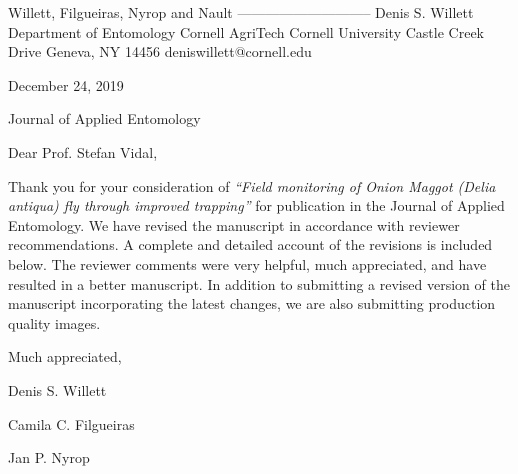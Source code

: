 \documentclass{article}
\begin{document}
\begin{addmargin}[2.8in]{}
Willett, Filgueiras, \newline
Nyrop and Nault \newline
----------------------------- \newline
Denis S. Willett\newline
Department of Entomology \newline
Cornell AgriTech  \newline
Cornell University  Castle Creek Drive \newline
Geneva, NY 14456 \newline
deniswillett@cornell.edu \newline
\end{addmargin}
\setlength{\parindent}{0cm}

December 24, 2019

\vspace{1.24em}

Journal of Applied Entomology 

\vspace{1.24em}

Dear Prof. Stefan Vidal,

\vspace{0.48em}
\setlength{\parindent}{1.24cm}

Thank you for your consideration of \textit{“Field monitoring of Onion Maggot (\textit{Delia antiqua}) fly through improved trapping”} for publication in the Journal of Applied Entomology.  We have revised the manuscript in accordance with reviewer recommendations.  A complete and detailed account of the revisions is included below.  The reviewer comments were very helpful, much appreciated, and have resulted in a better manuscript.  In addition to submitting a revised version of the manuscript incorporating the latest changes, we are also submitting production quality images.  
  

\vspace{2em}

Much appreciated, \newline

\vspace{1em}

Denis S. Willett
\vspace{0.48em}

Camila C. Filgueiras
\vspace{0.48em}

Jan P. Nyrop
\vspace{0.48em}
\end{document}
